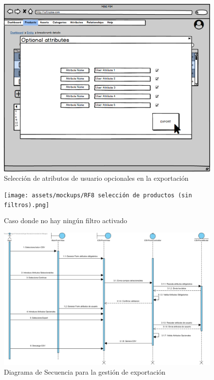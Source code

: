 \begin{figure}[H]
    \includegraphics[width=1\linewidth]{assets/mockups/RF8 Seleccion atributos opcionales.png}
    \caption{Selección de atributos de usuario opcionales en la exportación}
\end{figure}

\begin{figure}[H]
    \texttt{[image: assets/mockups/RF8 selección de productos (sin filtros).png]}
    \caption{Caso donde no hay ningún filtro activado}
\end{figure}

\begin{figure}[H]
    \includegraphics[width=1\linewidth]{assets/sequence/RF8.jpg}
    \caption{Diagrama de Secuencia para la gestión de exportación}
\end{figure}